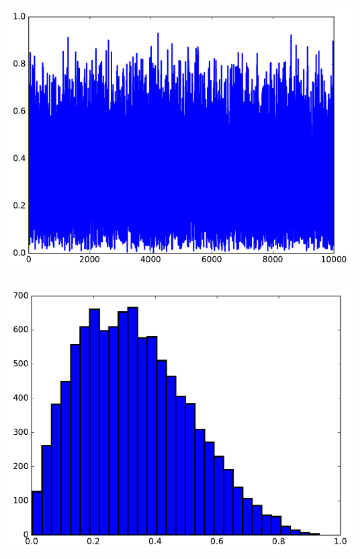 \begin{figure}[H] %
\captionsetup[subfigure]{justification=centering}
\centering
\begin{subfigure}{.325\textwidth}
    \centering
    \includegraphics[width=\linewidth]{figures/line_vs_histogram_bad.pdf}
\end{subfigure}
%
\begin{subfigure}{.325\textwidth}
    \centering
    \includegraphics[width=\linewidth]{figures/line_vs_histogram_hist.pdf}
\end{subfigure}
%
\begin{subfigure}{.325\textwidth}
    \centering

\end{subfigure}
\end{figure}
